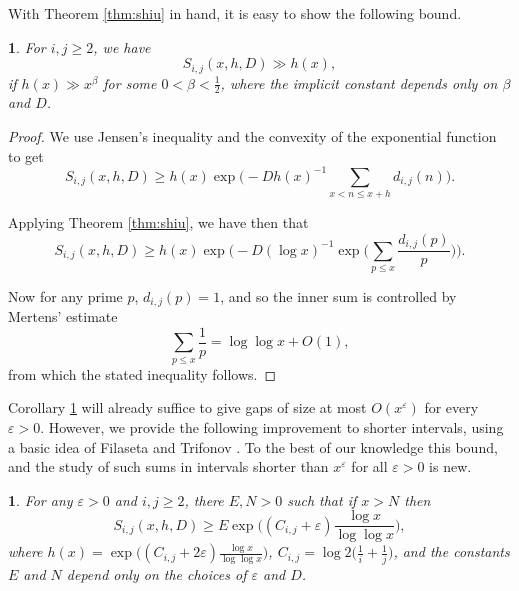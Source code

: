 \documentclass[12pt,english,BCOR7.5mm]{amsart}
\numberwithin{equation}{section}
\numberwithin{figure}{section}
\theoremstyle{definition}
\theoremstyle{plain}
\theoremstyle{plain}
\newtheorem{lem}[thm]{\protect\lemmaname}
\theoremstyle{plain}
\newtheorem{cor}[thm]{\protect\corollaryname}
\theoremstyle{definition}
\theoremstyle{plain}
\theoremstyle{plain}
\providecommand{\corollaryname}{Corollary}
\providecommand{\lemmaname}{Lemma}
\begin{document}
With Theorem \ref{thm:shiu} in hand, it is easy to show the following
bound.
\begin{cor}
\label{cor:shiu}For $i,j\geq2$, we have
\[
S_{i,j}(x,h,D)\gg h(x),
\]
if $h(x)\gg x^{\beta}$ for some $0<\beta<\frac{1}{2}$, where the
implicit constant depends only on $\beta$ and $D$.\end{cor}
\begin{proof}
We use Jensen's inequality and the convexity of the exponential function
to get
\[
S_{i,j}(x,h,D)\geq h(x)\exp\Big(-Dh(x)^{-1}\sum_{x<n\leq x+h}d_{i,j}(n)\Big).
\]

Applying Theorem \ref{thm:shiu}, we have then that
\[
S_{i,j}(x,h,D)\geq h(x)\exp\Big(-D(\log x)^{-1}\exp\Big(\sum_{p\leq x}\frac{d_{i,j}(p)}{p}\Big)\Big).
\]

Now for any prime $p$, $d_{i,j}(p)=1$, and so the inner sum is controlled
by Mertens' estimate \cite{Mertens}
\[
\sum_{p\leq x}\frac{1}{p}=\log\log x+O(1),
\]
from which the stated inequality follows.
\end{proof}
Corollary \ref{cor:shiu} will already suffice to give gaps of size
at most $O(x^{\varepsilon})$ for every $\varepsilon>0$. However,
we provide the following improvement to shorter intervals, using a
basic idea of Filaseta and Trifonov \cite{FT}. To the best of our
knowledge this bound, and the study of such sums in intervals shorter
than $x^{\varepsilon}$ for all $\varepsilon>0$ is new.
\begin{lem}
\label{lem:short}For any $\varepsilon>0$ and $i,j\geq2$, there
$E,N>0$ such that if $x>N$ then 
\[
S_{i,j}(x,h,D)\geq E\exp\Big((C_{i,j}+\varepsilon)\frac{\log x}{\log\log x}\Big),
\]
where $h(x)=\exp\Big((C_{i,j}+2\varepsilon)\frac{\log x}{\log\log x}\Big)$,
$C_{i,j}=\log2\Big(\frac{1}{i}+\frac{1}{j}\Big)$, and the constants
$E$ and $N$ depend only on the choices of $\varepsilon$ and $D$.\end{lem}
\end{document}
